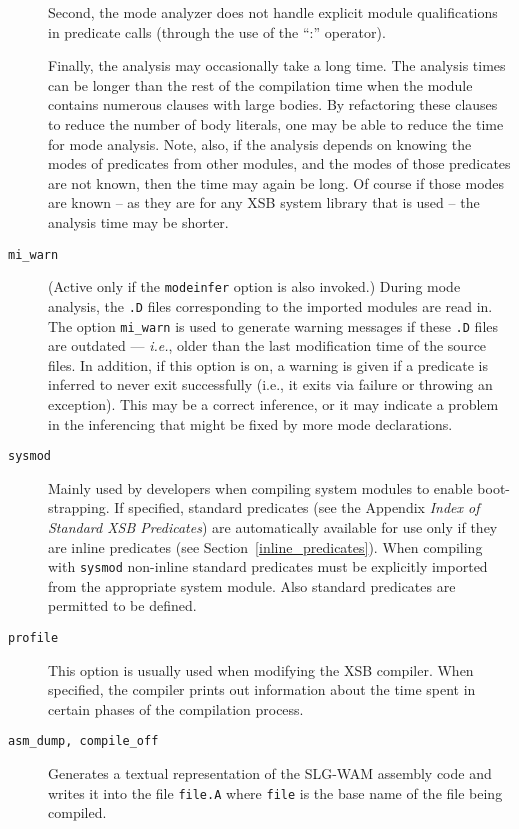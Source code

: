\begin{description}
        Second, the mode analyzer does not handle explicit module
        qualifications in predicate calls (through the use of the ``:''
        operator).

        Finally, the analysis may occasionally take a long time.  The
        analysis times can be longer than the rest of the compilation
        time when the module contains numerous clauses with large
        bodies.  By refactoring these clauses to reduce the number of
        body literals, one may be able to reduce the time for mode
        analysis.  Note, also, if the analysis depends on knowing the
        modes of predicates from other modules, and the modes of those
        predicates are not known, then the time may again be long.  Of
        course if those modes are known -- as they are for any XSB
        system library that is used -- the analysis time may be
        shorter.

\item[{\tt mi\_warn}]
  (Active only if the {\tt modeinfer} option is also invoked.)  During
  mode analysis, the {\tt .D} files corresponding to the imported
  modules are read in. The option {\tt mi\_warn} is used to generate
  warning messages if these {\tt .D} files are outdated --- {\em
    i.e.}, older than the last modification time of the source files.
  In addition, if this option is on, a warning is given if a predicate
  is inferred to never exit successfully (i.e., it exits via failure
  or throwing an exception).  This may be a correct inference, or it
  may indicate a problem in the inferencing that might be fixed by
  more mode declarations.


\item[{\tt sysmod}]  
%
Mainly used by developers when compiling system modules to enable
boot-strapping. If specified, standard predicates (see the Appendix
{\em Index of Standard XSB Predicates}) are automatically available
for use only if they are inline predicates (see
Section~\ref{inline_predicates}).  When compiling with {\tt sysmod}
non-inline standard predicates must be explicitly imported from the
appropriate system module.  Also standard predicates are permitted to
be defined.
%
\item[{\tt profile}] This option is usually used when modifying the
  XSB compiler.  When specified, the compiler prints out information
  about the time spent in certain phases of the compilation process.
%
\item[{\tt asm\_dump, compile\_off}] Generates a textual representation of 
	the SLG-WAM assembly code and writes it into the file {\tt file.A}
	where {\tt file} is the base name of the file being compiled.  
	

\end{description}
